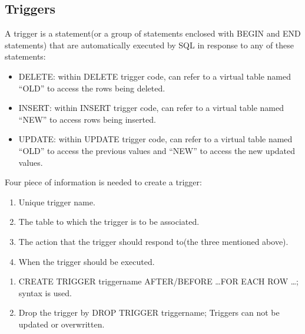 \documentclass[12pt,oneside,a4paper]{article}
\begin{document}
\subsection{Triggers}
A trigger is a statement(or a group of statements enclosed with BEGIN and END statements) that are automatically executed by SQL in response to any of these statements: 
\begin{itemize}
\item DELETE: within DELETE trigger code, can refer to a virtual table named ``OLD'' to access the rows being deleted. 

\item INSERT: within INSERT trigger code, can refer to a virtual table named ``NEW'' to access rows being inserted. 

\item UPDATE: within UPDATE trigger code, can refer to a virtual table named ``OLD'' to access the previous values and ``NEW'' to access the new updated values. 

\end{itemize}

Four piece of information is needed to create a trigger: 
\begin{enumerate}
\item Unique trigger name.
\item The table to which the trigger is to be associated.
\item The action that the trigger should respond to(the three mentioned above).
\item When the trigger should be executed. 
\end{enumerate}

\begin{enumerate}
\item \textsf{CREATE TRIGGER triggername AFTER/BEFORE \ldots FOR EACH ROW \ldots;} syntax is used. 

\item Drop the trigger by \textsf{DROP TRIGGER triggername;} Triggers can not be updated or overwritten. 
\end{enumerate}
\end{document}
